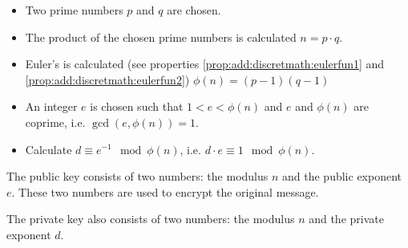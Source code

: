 \begin{itemize}
\item Two prime numbers $p$ and $q$ are chosen.
\item The product of the chosen prime numbers is calculated $n = p\cdot q$.
\item Euler's  is calculated (see properties \ref{prop:add:discretmath:eulerfun1} and \ref{prop:add:discretmath:eulerfun2})
\(
\phi\left(n\right)=\left(p - 1 \right)\left(q - 1 \right)
\)
\item An integer $e$ is chosen such that 
\(
1 < e < \phi\left(n\right)
\) and $e$ and $\phi\left(n\right)$ are coprime, i.e. 
\(
\gcd\left( e, \phi\left(n\right) \right) = 1.
\)
\item Calculate $d \equiv e^{-1} \mod{\phi\left(n\right)}$, i.e. $d \cdot e \equiv 1 \mod{\phi\left(n\right)}$.
\end{itemize}

The public key consists of two numbers: the modulus $n$ and the public exponent $e$. These two numbers are used to encrypt the original message.

The private key also consists of two numbers: the modulus $n$ and the private exponent $d$.